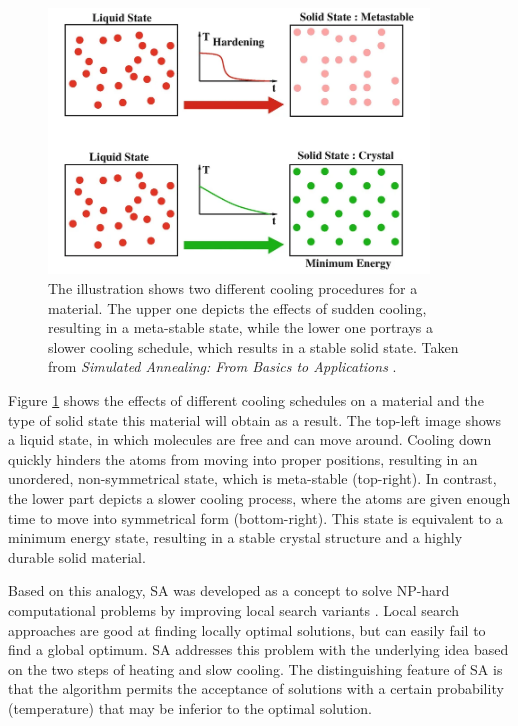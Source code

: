 \begin{figure}
	\centering
	\includegraphics[width=0.9\textwidth]{bilder/AnnealingIllustration.png}
	\caption{The illustration shows two different cooling procedures for a material. The upper one depicts the effects of sudden cooling, resulting in a meta-stable state, while the lower one portrays a slower cooling schedule, which results in a stable solid state. Taken from \textit{Simulated Annealing: From Basics to Applications} \cite{delahaye_simulated_2019}.}
	\label{fig:annealingIllustration}
\end{figure}


Figure \ref{fig:annealingIllustration} shows the effects of different cooling schedules on a material and the type of solid state this material will obtain as a result.
The top-left image shows a liquid state, in which molecules are free and can move around.
Cooling down quickly hinders the atoms from moving into proper positions, resulting in an unordered, non-symmetrical state, which is meta-stable (top-right).
In contrast, the lower part depicts a slower cooling process, where the atoms are given enough time to move into symmetrical form (bottom-right).
This state is equivalent to a minimum energy state, resulting in a stable crystal structure and a highly durable solid material. 


Based on this analogy, SA was developed as a concept to solve NP-hard computational problems by improving local search variants \cite{aarts_simulated_2005, eglese_simulated_1990}.
Local search approaches are good at finding locally optimal solutions, but can easily fail to find a global optimum.
SA addresses this problem with the underlying idea based on the two steps of heating and slow cooling.
The distinguishing feature of SA is that the algorithm permits the acceptance of solutions with a certain probability (temperature) that may be inferior to the optimal solution.


